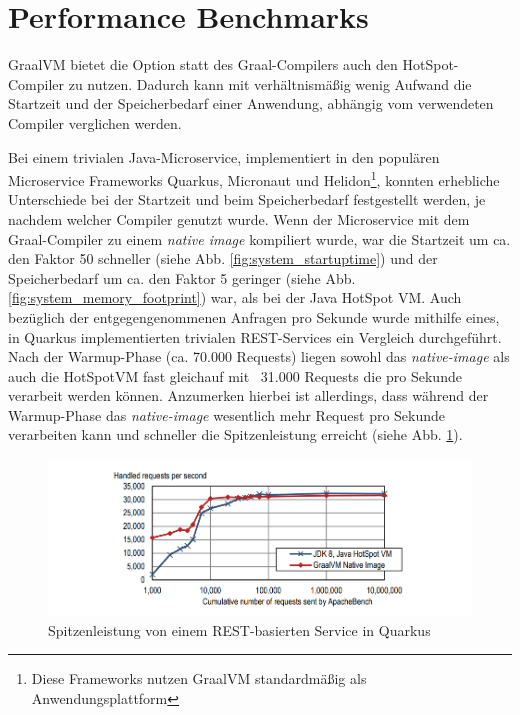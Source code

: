 \section{Performance Benchmarks}
\label{sec:performanceBenchmarks}

GraalVM bietet die Option statt des Graal-Compilers auch den HotSpot-Compiler zu nutzen. Dadurch kann mit verhältnismäßig wenig Aufwand
die Startzeit und der Speicherbedarf einer Anwendung, abhängig vom verwendeten Compiler verglichen werden.

 Bei einem trivialen Java-Microservice, implementiert in den populären
Microservice Frameworks Quarkus, Micronaut und Helidon\footnote{Diese Frameworks nutzen GraalVM standardmäßig als Anwendungsplattform}, konnten erhebliche Unterschiede bei der Startzeit und 
beim Speicherbedarf festgestellt werden, je nachdem welcher Compiler genutzt wurde. Wenn der Microservice mit dem Graal-Compiler zu einem \textit{native image} kompiliert wurde, war die Startzeit um
ca. den Faktor 50 schneller (siehe Abb. \ref{fig:system_startuptime}) und der Speicherbedarf um ca. den Faktor 5 geringer (siehe Abb. \ref{fig:system_memory_footprint}) war,
 als bei der Java HotSpot VM. Auch bezüglich der entgegengenommenen Anfragen pro Sekunde wurde mithilfe eines, in Quarkus implementierten
 trivialen REST-Services ein Vergleich durchgeführt. Nach der Warmup-Phase (ca. 70.000 Requests) liegen sowohl das \textit{native-image} als auch die HotSpotVM fast gleichauf mit ~31.000 Requests die pro
 Sekunde verarbeit werden können. Anzumerken hierbei ist allerdings, dass während der Warmup-Phase das \textit{native-image} wesentlich mehr Request pro Sekunde verarbeiten kann und schneller die
 Spitzenleistung erreicht (siehe Abb. \ref{fig:system_request}).
\begin{figure}[h]
	\centering
	\includegraphics[width=.9\textwidth]{resources/requests_vergleich.png}
	\caption{Spitzenleistung von einem REST-basierten Service in Quarkus \parencite[Fig.12]{Wimmer2019}}
	\label{fig:system_request}
\end{figure} 
\newpage
